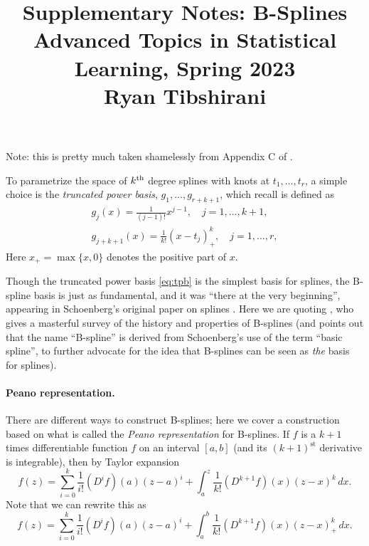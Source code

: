 \documentclass{article}
\title{Supplementary Notes: B-Splines \\ \smallskip
\large Advanced Topics in Statistical Learning, Spring 2023 \\ \smallskip
Ryan Tibshirani}
\author{}
\date{}
\begin{document}
\maketitle
\RaggedRight
\vspace{-50pt}

Note: this is pretty much taken shamelessly from Appendix C of
\citet{tibshirani2022divided}.  

To parametrize the space of $k^{\text{th}}$ degree splines with knots at $t_1,\dots,t_r$,
a simple choice is the \emph{truncated power basis}, $g_1, \dots, g_{r+k+1}$,
which recall is defined as    
\begin{equation}
\begin{gathered}
\label{eq:tpb}
g_j(x) = \frac{1}{(j-1)!} x^{j-1}, \quad j=1,\dots,k+1, \\
g_{j+k+1}(x) = \frac{1}{k!} (x-t_j)^k_+, \quad j=1,\dots,r,
\end{gathered}
\end{equation}
Here $x_+=\max\{x,0\}$ denotes the positive part of $x$. 

Though the truncated power basis \eqref{eq:tpb} is the simplest basis for
splines, the B-spline basis is just as fundamental, and it was ``there at the 
very beginning'', appearing in Schoenberg's original paper on splines
\citep{schoenberg1946contributions1}. Here we are quoting
\citet{deboor1976splines}, who gives a masterful survey of the history and
properties of B-splines (and points out that the name ``B-spline'' is derived
from Schoenberg's use of the term ``basic spline'', to further advocate for the
idea that B-splines can be seen as \emph{the} basis for splines).

\paragraph{Peano representation.}

\def\st{^{\text{st}}}

There are different ways to construct B-splines; here we cover a construction
based on what is called the \emph{Peano representation} for B-splines. If $f$ is
a $k+1$ times differentiable function $f$ on an interval $[a,b]$ (and its
$(k+1)\st$ derivative is integrable), then by Taylor expansion
\[
f(z) = \sum_{i=0}^k \frac{1}{i!} (D^i f)(a) (z-a)^i + 
\int_a^z \frac{1}{k!} (D^{k+1} f)(x) (z-x)^k \, dx.
\]
Note that we can rewrite this as
\begin{equation}
\label{eq:taylor}
f(z) = \sum_{i=0}^k \frac{1}{i!} (D^i f)(a) (z-a)^i + 
\int_a^b \frac{1}{k!} (D^{k+1} f)(x) (z-x)^k_+ \, dx. 
\end{equation}
\end{document}
